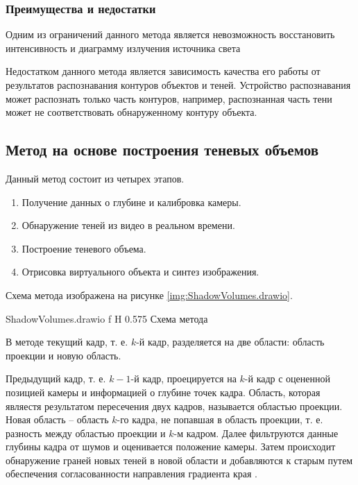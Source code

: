 \subsubsection*{Преимущества и недостатки}

Одним из ограничений данного метода является невозможность восстановить интенсивность и диаграмму излучения источника света

Недостатком данного метода является зависимость качества его работы от результатов распознавания контуров объектов и теней. Устройство распознавания может распознать только часть контуров, например, распознанная часть тени может не соответствовать обнаруженному контуру объекта. 

\subsection{Метод на основе построения теневых объемов}

Данный метод состоит из четырех этапов.

\begin{enumerate}
	\item Получение данных о глубине и калибровка камеры.
	\item Обнаружение теней из видео в реальном времени.
	\item Построение теневого объема.
	\item Отрисовка виртуального объекта и синтез изображения.
\end{enumerate}

Схема метода изображена на рисунке \ref{img:ShadowVolumes.drawio}.

	{ShadowVolumes.drawio}
	{f}
	{H}
	{0.575\textwidth}
	{Схема метода}

В методе текущий кадр, т. е. $k$-й кадр, разделяется на две области: область проекции и новую область. 

Предыдущий кадр, т. е. $k-1$-й кадр, проецируется на $k$-й кадр с оцененной позицией камеры и информацией о глубине точек кадра. Область, которая являестя результатом пересечения двух кадров, называется областью проекции. Новая область -- область $k$-го кадра, не попавшая в область проекции, т. е. разность между областью проекции и $k$-м кадром. Далее фильтруются данные глубины кадра от шумов и оценивается положение камеры. Затем происходит обнаружение граней новых теней в новой области и добавляются к старым путем обеспечения согласованности направления градиента края \cite{wei2019simulating}. 

